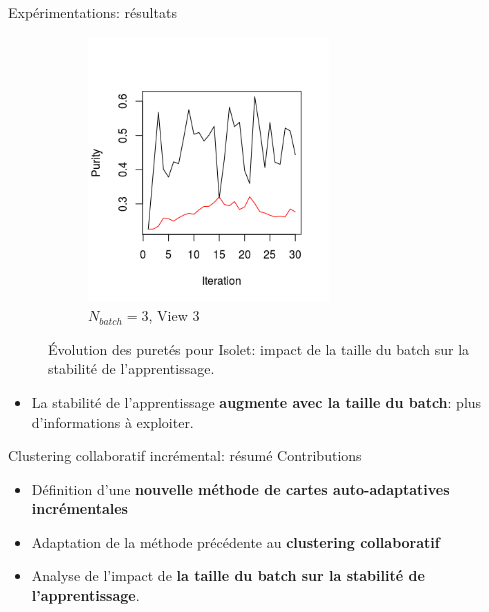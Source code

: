 \documentclass[hyperref={pdfpagelabels=false}]{beamer}
\begin{document}
\begin{frame}{Expérimentations: résultats}
\begin{figure}[!h]
\begin{subfigure}[b]{0.3\textwidth}
                    \includegraphics[width=0.7\textwidth, trim= 0cm 0.5cm 1cm 2cm, clip]{img/p3.png}
                    \caption{$N_{batch}=3$, View 3}
                \end{subfigure}
                \caption{Évolution des puretés pour Isolet: impact de la taille 
                du batch sur la stabilité de l'apprentissage.}
            \end{figure}
            \begin{itemize}
                \item La stabilité de l'apprentissage \textbf{augmente avec la 
                    taille du batch}: plus d'informations à exploiter.
            \end{itemize}
        \end{frame}

        \begin{frame}{Clustering collaboratif incrémental: résumé}
            Contributions
            \begin{itemize}
                \item Définition d'une \textbf{nouvelle méthode de cartes
                    auto-adaptatives incrémentales}
                \item Adaptation de la méthode précédente au \textbf{clustering
                    collaboratif}
                \item Analyse de l'impact de \textbf{la taille du batch sur la 
                    stabilité de l'apprentissage}.
            \end{itemize}

            \begin{center}
                \fontsize{14pt}{15pt}
            \end{center}
        \end{frame}
\end{document}
